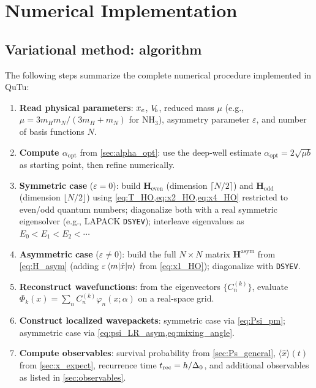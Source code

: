 \section{Numerical Implementation}\label{sec:numerical_impl}

\subsection{Variational method: algorithm}

The following steps summarize the complete numerical procedure implemented in QuTu:

\begin{enumerate}
  \item \textbf{Read physical parameters}: $x_e$, $V_{\!b}$, reduced mass $\mu$
    (e.g., $\mu = 3m_H m_N/(3m_H+m_N)$ for NH$_3$), asymmetry parameter $\varepsilon$,
    and number of basis functions $N$.
  \item \textbf{Compute $\alpha_{\text{opt}}$} from \cref{sec:alpha_opt}:
    use the deep-well estimate $\alpha_{\text{opt}} = 2\sqrt{\mu b}$ as starting point,
    then refine numerically.
  \item \textbf{Symmetric case} ($\varepsilon = 0$): build $\mathbf{H}_{\text{even}}$
    (dimension $\lceil N/2\rceil$) and $\mathbf{H}_{\text{odd}}$ (dimension
    $\lfloor N/2\rfloor$) using \cref{eq:T_HO,eq:x2_HO,eq:x4_HO} restricted to
    even/odd quantum numbers; diagonalize both with a real symmetric eigensolver
    (e.g., LAPACK \texttt{DSYEV}); interleave eigenvalues as $E_0 < E_1 < E_2 < \cdots$
  \item \textbf{Asymmetric case} ($\varepsilon \neq 0$): build the full $N\times N$
    matrix $\mathbf{H}^{\text{asym}}$ from \cref{eq:H_asym} (adding
    $\varepsilon\mel{m}{\hat{x}}{n}$ from \cref{eq:x1_HO}); diagonalize with
    \texttt{DSYEV}.
  \item \textbf{Reconstruct wavefunctions}: from the eigenvectors
    $\{C_n^{(k)}\}$, evaluate $\Phi_k(x) = \sum_n C_n^{(k)}\varphi_n(x;\alpha)$
    on a real-space grid.
  \item \textbf{Construct localized wavepackets}: symmetric case via
    \cref{eq:Psi_pm}; asymmetric case via \cref{eq:psi_LR_asym,eq:mixing_angle}.
  \item \textbf{Compute observables}: survival probability from \cref{sec:Ps_general},
    $\langle\hat{x}\rangle(t)$ from \cref{sec:x_expect}, recurrence time
    $t_{\text{rec}} = h/\Delta_0$, and additional observables as listed in
    \cref{sec:observables}.
\end{enumerate}


